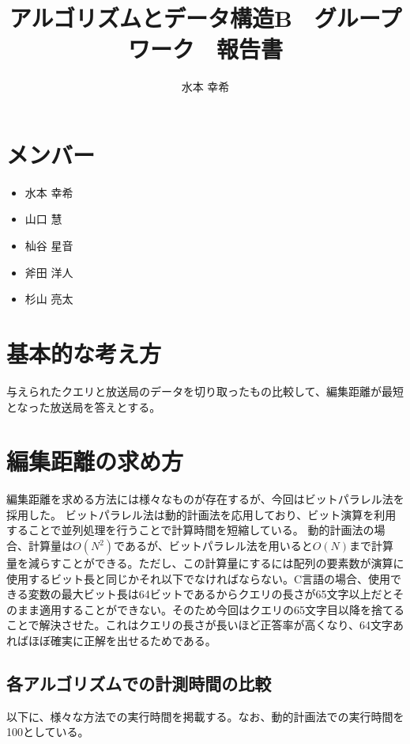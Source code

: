 \documentclass[dvipdfmx]{jsarticle}
\begin{document}
\lstset{
    frame=single,
    numbers=left
}

\title{アルゴリズムとデータ構造B　グループワーク　報告書}
\author{水本 幸希}
\maketitle

\section{メンバー}
\begin{itemize}
  \item 水本 幸希
  \item 山口 慧
  \item 杣谷 星音
  \item 斧田 洋人
  \item 杉山 亮太
\end{itemize}

\section{基本的な考え方}
与えられたクエリと放送局のデータを切り取ったもの比較して、編集距離が最短となった放送局を答えとする。

\section{編集距離の求め方}

編集距離を求める方法には様々なものが存在するが、今回はビットパラレル法を採用した。
ビットパラレル法は動的計画法を応用しており、ビット演算を利用することで並列処理を行うことで計算時間を短縮している。
動的計画法の場合、計算量は$O(N^2)$であるが、ビットパラレル法を用いると$O(N)$まで計算量を減らすことができる。ただし、この計算量にするには配列の要素数が演算に使用するビット長と同じかそれ以下でなければならない。C言語の場合、使用できる変数の最大ビット長は64ビットであるからクエリの長さが65文字以上だとそのまま適用することができない。そのため今回はクエリの65文字目以降を捨てることで解決させた。これはクエリの長さが長いほど正答率が高くなり、64文字あればほぼ確実に正解を出せるためである。

\subsection{各アルゴリズムでの計測時間の比較}
以下に、様々な方法での実行時間を掲載する。なお、動的計画法での実行時間を100としている。
\end{document}
